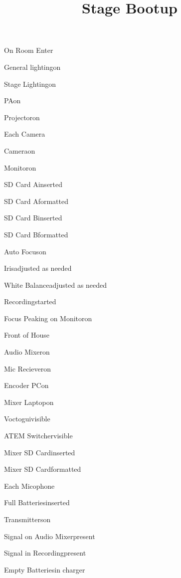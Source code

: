 \def\papersize{4}




\title{Stage Bootup}

\begin{checklist}{On Room Enter}
  \item{General lighting}{on}
  \item{Stage Lighting}{on}
  \item{PA}{on}
  \item{Projector}{on}
\end{checklist}

\begin{checklist}{Each Camera}
  \item{Camera}{on}
  \item{Monitor}{on}
  \item{SD Card A}{inserted}
  \item{SD Card A}{formatted}
  \item{SD Card B}{inserted}
  \item{SD Card B}{formatted}
  \item{Auto Focus}{on}
  \item{Iris}{adjusted as needed}
  \item{White Balance}{adjusted as needed}
  \item{Recording}{started}
  \item{Focus Peaking on Monitor}{on}
\end{checklist}

\begin{checklist}{Front of House}
  \item{Audio Mixer}{on}
  \item{Mic Reciever}{on}
  \item{Encoder PC}{on}
  \item{Mixer Laptop}{on}
  \item{Voctogui}{visible}
  \item{ATEM Switcher}{visible}
  \item{Mixer SD Card}{inserted}
  \item{Mixer SD Card}{formatted}
\end{checklist}

\begin{checklist}{Each Micophone}
  \item{Full Batteries}{inserted}
  \item{Transmitters}{on}
  \item{Signal on Audio Mixer}{present}
  \item{Signal in Recording}{present}
  \item{Empty Batteries}{in charger}
\end{checklist}

